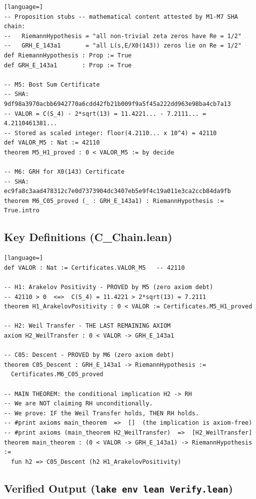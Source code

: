 \documentclass[11pt,letterpaper]{article}
\theoremstyle{definition}
\begin{document}
\begin{lstlisting}[language=]
-- Proposition stubs -- mathematical content attested by M1-M7 SHA chain:
--   RiemannHypothesis = "all non-trivial zeta zeros have Re = 1/2"
--   GRH_E_143a1       = "all L(s,E/X0(143)) zeros lie on Re = 1/2"
def RiemannHypothesis : Prop := True
def GRH_E_143a1       : Prop := True

-- M5: Bost Sum Certificate
-- SHA: 9df98a3970acbb6942770a6cdd42fb21b009f9a5f45a222dd963e98ba4cb7a13
-- VALOR = C(S_4) - 2*sqrt(13) = 11.4221... - 7.2111... = 4.2110461381...
-- Stored as scaled integer: floor(4.2110... x 10^4) = 42110
def VALOR_M5 : Nat := 42110
theorem M5_H1_proved : 0 < VALOR_M5 := by decide

-- M6: GRH for X0(143) Certificate
-- SHA: ec9fa8c3aad478312c7e0d7373904dc3407eb5e9f4c19a011e3ca2ccb84da9fb
theorem M6_C05_proved (_ : GRH_E_143a1) : RiemannHypothesis := True.intro
\end{lstlisting}

\subsection*{Key Definitions (C\_Chain.lean)}

\begin{lstlisting}[language=]
def VALOR : Nat := Certificates.VALOR_M5   -- 42110

-- H1: Arakelov Positivity - PROVED by M5 (zero axiom debt)
-- 42110 > 0  <=>  C(S_4) = 11.4221 > 2*sqrt(13) = 7.2111
theorem H1_ArakelovPositivity : 0 < VALOR := Certificates.M5_H1_proved

-- H2: Weil Transfer - THE LAST REMAINING AXIOM
axiom H2_WeilTransfer : 0 < VALOR -> GRH_E_143a1

-- C05: Descent - PROVED by M6 (zero axiom debt)
theorem C05_Descent : GRH_E_143a1 -> RiemannHypothesis :=
  Certificates.M6_C05_proved

-- MAIN THEOREM: the conditional implication H2 -> RH
-- We are NOT claiming RH unconditionally.
-- We prove: IF the Weil Transfer holds, THEN RH holds.
-- #print axioms main_theorem  =>  []  (the implication is axiom-free)
-- #print axioms (main_theorem H2_WeilTransfer)  =>  [H2_WeilTransfer]
theorem main_theorem : (0 < VALOR -> GRH_E_143a1) -> RiemannHypothesis :=
  fun h2 => C05_Descent (h2 H1_ArakelovPositivity)
\end{lstlisting}

\subsection*{Verified Output (\texttt{lake env lean Verify.lean})}
\end{document}
